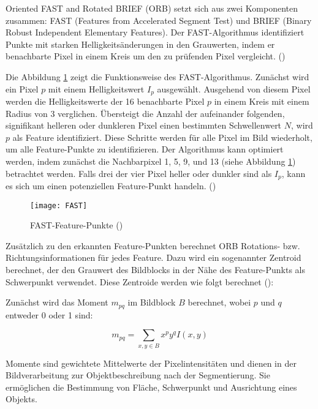 Oriented FAST and Rotated BRIEF (ORB) setzt sich aus zwei Komponenten zusammen: FAST (Features from Accelerated Segment Test) und BRIEF (Binary Robust Independent Elementary Features). Der FAST-Algorithmus identifiziert Punkte mit starken Helligkeitsänderungen in den Grauwerten, indem er benachbarte Pixel in einem Kreis um den zu prüfenden Pixel vergleicht. (\cite{gao2021vSLAM, rublee2011orb})

Die Abbildung \ref{fig:FAST} zeigt die Funktionsweise des FAST-Algorithmus. Zunächst wird ein Pixel \( p \) mit einem Helligkeitswert \( I_p \) ausgewählt. Ausgehend von diesem Pixel werden die Helligkeitswerte der 16 benachbarte Pixel \( p \) in einem Kreis mit einem Radius von 3 verglichen. Übersteigt die Anzahl der aufeinander folgenden, signifikant helleren oder dunkleren Pixel einen bestimmten Schwellenwert \( N \), wird \( p \) als Feature identifiziert. Diese Schritte werden für alle Pixel im Bild wiederholt, um alle Feature-Punkte zu identifizieren. Der Algorithmus kann optimiert werden, indem zunächst die Nachbarpixel 1, 5, 9, und 13 (siehe Abbildung \ref{fig:FAST}) betrachtet werden. Falls drei der vier Pixel heller oder dunkler sind als \( I_p \), kann es sich um einen potenziellen Feature-Punkt handeln. (\cite{gao2021vSLAM, rosten2006fast})

\begin{figure}
    \centering
    \texttt{[image: FAST]}
    \caption{FAST-Feature-Punkte (\cite{rosten2006fast})\label{fig:FAST}}\par
\end{figure}

Zusätzlich zu den erkannten Feature-Punkten berechnet ORB Rotations- bzw. Richtungsinformationen für jedes Feature. Dazu wird ein sogenannter Zentroid berechnet, der den Grauwert des Bildblocks in der Nähe des Feature-Punkts als Schwerpunkt verwendet. Diese Zentroide werden wie folgt berechnet (\cite{gao2021vSLAM, rublee2011orb}):

Zunächst wird das Moment \( m_{pq} \) im Bildblock \( B \) berechnet, wobei \( p \) und \( q \) entweder 0 oder 1 sind:

\begin{equation}
    m_{pq} = \sum_{x,y \in B} x^p y^q I(x, y)
\end{equation}

\begin{tcolorbox}[colback=THAi-Blue!20!white, colframe=THAi-Blue]
    Momente sind gewichtete Mittelwerte der Pixelintensitäten und dienen in der Bildverarbeitung zur Objektbeschreibung nach der Segmentierung. Sie ermöglichen die Bestimmung von Fläche, Schwerpunkt und Ausrichtung eines Objekts.
\end{tcolorbox}

